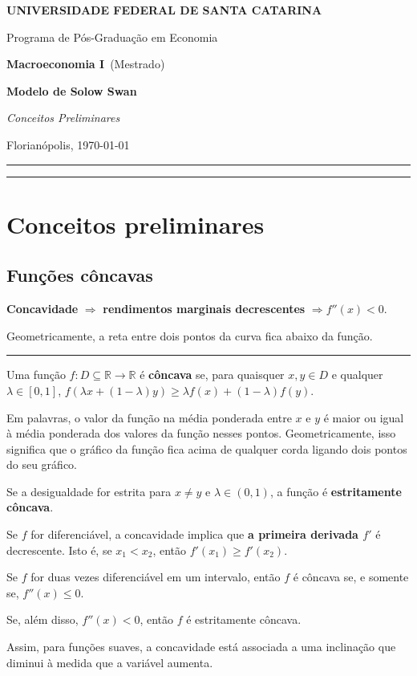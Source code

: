 \documentclass[12pt]{article}
\newcommand{\instituicao}{UNIVERSIDADE FEDERAL DE SANTA CATARINA}
\newcommand{\departamento}{Programa de Pós-Graduação em Economia}
\newcommand{\curso}{Mestrado}
\newcommand{\disciplina}{Macroeconomia I}
\newcommand{\titulo}{Modelo de Solow Swan}
\newcommand{\subtitulo}{Conceitos Preliminares}
\newcommand{\autor}{}
\newcommand{\local}{Florianópolis}
\newcommand{\dataentrega}{\today}
\newcommand{\imprimirtitulo}{
\noindent

\begin{center}
  {\Large\bfseries\MakeUppercase{\instituicao}\par}
  \vspace{0.2em}
  {\large \departamento\par}
  \vspace{0.2em}
  {\normalsize\textbf{\disciplina}\ (\curso)\par}
  \vspace{1.4em}
  {\LARGE\bfseries \titulo\par}
  \vspace{0.25em}
  {\large\itshape \subtitulo\par}
  \vspace{1.5em}
\end{center}

\noindent
\begin{minipage}{0.48\textwidth}
  \raggedright\normalsize \autor
\end{minipage}\hfill
\begin{minipage}{0.48\textwidth}
  \raggedleft\normalsize \local, \dataentrega
\end{minipage}

\vspace{1.0em}
\hrule
}
\begin{document}
\imprimirtitulo


\renewcommand{\contentsname}{Sumário}
\tableofcontents
\vspace{1.5em}
\hrule

\newpage
\section{Conceitos preliminares}

\subsection{Funções côncavas}

\textbf{Concavidade} $\Rightarrow$ \textbf{rendimentos marginais decrescentes} $\Rightarrow f''(x) < 0$. 

Geometricamente, a reta entre dois pontos da curva fica abaixo da função.

\noindent\rule{\textwidth}{0.4pt}

Uma função $f : D \subseteq \mathbb{R} \to \mathbb{R}$ é \textbf{côncava} se, para quaisquer $x,y \in D$ e qualquer $\lambda \in [0,1]$,
$f(\lambda x + (1-\lambda)y) \geq \lambda f(x) + (1-\lambda)f(y)$.

Em palavras, o valor da função na média ponderada entre $x$ e $y$ é maior ou igual à média ponderada dos valores da função nesses pontos. Geometricamente, isso significa que o gráfico da função fica acima de qualquer corda ligando dois pontos do seu gráfico.

Se a desigualdade for estrita para $x \neq y$ e $\lambda \in (0,1)$, a função é \textbf{estritamente côncava}.

Se $f$ for diferenciável, a concavidade implica que \textbf{a primeira derivada $f'$} é decrescente. Isto é, se $x_1 < x_2$, então
$f'(x_1) \geq f'(x_2)$.

Se $f$ for duas vezes diferenciável em um intervalo, então $f$ é côncava se, e somente se,
$f''(x) \leq 0$.

Se, além disso,
$f''(x) < 0$,
então $f$ é estritamente côncava.

Assim, para funções suaves, a concavidade está associada a uma inclinação que diminui à medida que a variável aumenta.
\end{document}
